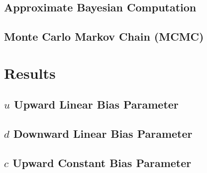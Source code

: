 \documentclass[11pt]{beamer}
\begin{document}
    \subsection{Approximate Bayesian Computation}\label{subsec:approximateBayesianComputation}
    \begin{frame}

    \end{frame}

	\subsection{Monte Carlo Markov Chain (MCMC)}\label{subsec:monteCarloMarkovChainmcmc}
    \begin{frame}

    \end{frame}

    \section{Results}\label{sec:results}
    \begin{frame}

    \end{frame}

    \subsection{$u$ Upward Linear Bias Parameter}\label{subsec:upwardLinearBiasParameter}
    \begin{frame}

    \end{frame}

    \subsection{$d$ Downward Linear Bias Parameter}\label{subsec:downwardLinearBiasParameter}
    \begin{frame}

    \end{frame}

    \subsection{$c$ Upward Constant Bias Parameter}\label{subsec:upwardConstantBiasParameter}
    \begin{frame}

    \end{frame}
\end{document}
